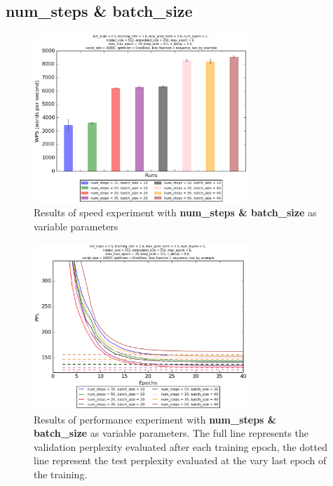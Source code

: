 \documentclass[10pt,a4paper,titlepage]{article}
\begin{document}
\subsection{num\_steps \& batch\_size}

\begin{figure}[H]
	\begin{center}
		\includegraphics[width=0.72\textwidth]{stepsbatchspeed.eps}
		\caption{Results of speed experiment with \textbf{num\_steps \& batch\_size} as variable parameters}
		\label{fig:exp3speed}
	\end{center}	
\end{figure}

\begin{figure}[H]
	\begin{center}
		\includegraphics[width=0.72\textwidth]{stepsbatchperf.eps}
		\caption{Results of performance experiment with \textbf{num\_steps \& batch\_size} as variable parameters. The full line represents the validation perplexity evaluated after each training epoch, the dotted line represent the test perplexity evaluated at the vary last epoch of the training.}
		\label{fig:exp3perf}
	\end{center}	
\end{figure}
\end{document}
